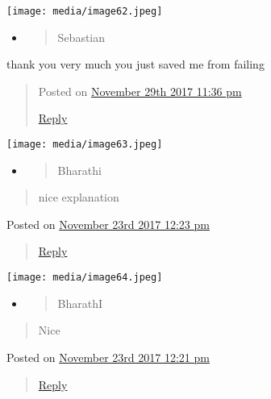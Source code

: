 \documentclass[]{article}
\begin{document}
\texttt{[image: media/image62.jpeg]}

\begin{itemize}
\item
  \begin{quote}
  Sebastian
  \end{quote}
\end{itemize}

thank you very much you just saved me from failing

\begin{quote}
Posted on \protect\hyperlink{page11}{November 29th 2017 \textbar{} 11:36
pm}

\href{https://www.electronics-tutorials.ws/accircuits/series-resonance.html?replytocom=43063\#respond}{Reply}
\end{quote}

\texttt{[image: media/image63.jpeg]}

\begin{itemize}
\item
  \begin{quote}
  Bharathi
  \end{quote}
\end{itemize}

\begin{quote}
nice explanation
\end{quote}

Posted on \protect\hyperlink{page11}{November 23rd 2017 \textbar{} 12:23
pm}

\begin{quote}
\href{https://www.electronics-tutorials.ws/accircuits/series-resonance.html?replytocom=42169\#respond}{Reply}
\end{quote}

\texttt{[image: media/image64.jpeg]}

\begin{itemize}
\item
  \begin{quote}
  BharathI
  \end{quote}
\end{itemize}

\begin{quote}
Nice
\end{quote}

Posted on \protect\hyperlink{page11}{November 23rd 2017 \textbar{} 12:21
pm}

\begin{quote}
\href{https://www.electronics-tutorials.ws/accircuits/series-resonance.html?replytocom=42168\#respond}{Reply}
\end{quote}
\end{document}
